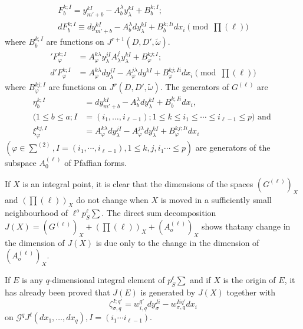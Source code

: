 \begin{gather*}
  F_b^{k;I} = y_{m'+b}^{kI} - A^{\lambda}_b y_{\lambda}^{kI} +
  B_b^{k;I};\\ 
  dF_b^{k;I} \equiv dy_{m'+b}^{kI} - A^{\lambda}_b dy_{\lambda}^{kI} +
  B_b^{k;Ii} dx_i  \pmod {\prod (\ell )} 
\end{gather*}
where $B_b^{k ; I}$ are functions on $J^{r+1} (D,D', \tilde{\omega})$.
\begin{align*}
  'F_\varphi^{k;I} & =  A^{k\lambda}_\varphi y^{j I}_{\lambda} A^j_\lambda y^{k
    I}_{\lambda} + B_\varphi^{kj;I};\\ 
  d'F_\varphi^{k;I} & = A_{\varphi }^{k\lambda} dy^{jI}_\lambda
  -A_{\varphi}^{j \lambda} dy^{kI}+ B_\varphi^{kj;Ii} dx_i \pmod{\prod
  (\ell)} 	 
\end{align*}
where $B_{\varphi}^{kj;I}$ are functions on $J^r (D, D',
\tilde{\omega})$. The generators of $G^{(\ell)}$ are 
\begin{align*}
  \eta_b^{k;I} & = dy_{m'+b}^{kI} - A_b^\lambda dy_{\lambda}^{kI}+ B_b^{k;Ii} dx_i,\\
  (1 \leq b \leq a; I & = (i_1 , \ldots , i_{\ell -1}); 1 \leq k \leq
  i_1 \leq \cdots \leq i_{\ell -1} \leq p) \text{ and } \\ 
  \xi_{\varphi}^{kj,I} & = A_{\varphi}^{k \lambda} dy_{\lambda}^{jI} -
  A_{\varphi}^{j \lambda} dy_{\lambda}^{kI} + B_{\varphi}^{kj;Ii} dx_i 
\end{align*}
$(\varphi \in \sum^{(2)}, I = (i_{1},\cdots , i_{\ell -1}), 1 \leq k,
j,i_1 \cdots \leq p)$ are generators of the subspace $A_0^{(\ell)}$ of
Pfaffian forms. 

If $X$ is an integral point, it is clear that the dimensions of the
spaces $(G^{(\ell)})_X$ and $(\prod (\ell))_X$ do not change when $X$ is
moved in a sufficiently small neighbourhood of $\ell^o p_S^{\ell}
\sum$. The direct sum decomposition $J(X) = (G^{(\ell)})_X + (\prod
(\ell))_X + (A_o^{(\ell)})_X$ shows that\pageoriginale any change in the dimension
of $J(X)$ is due only to the change in the dimension of
$(A_o^{(\ell)})_X$. 

If $E$ is any $q$-dimensional integral element of $p_S ^{\ell} \sum$
and if $X$ is the origin of $E$, it has already been proved that
$J(E)$ is generated by $J(X)$ together with 
$$
\zeta_{\sigma , q}^{I;q'} = w_{i,q}^{q'} dy_{\sigma}^{Ii} - w_{\sigma,
  q}^{Iiq'} dx_i 
$$
on $\mathscr{G}^q J^\ell (dx_1, \ldots, dx_q) , I = (i_1 \cdots
i_{\ell -1})$. 

